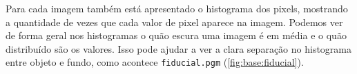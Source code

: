 Para cada imagem também está apresentado o histograma dos pixels, mostrando a quantidade de vezes que cada valor de pixel aparece na imagem. Podemos ver de forma geral nos histogramas o quão escura uma imagem é em média e o quão distribuído são os valores. Isso pode ajudar a ver a clara separação no histograma entre objeto e fundo, como acontece \texttt{fiducial.pgm} (\cref{fig:base:fiducial}).








\endgroup

